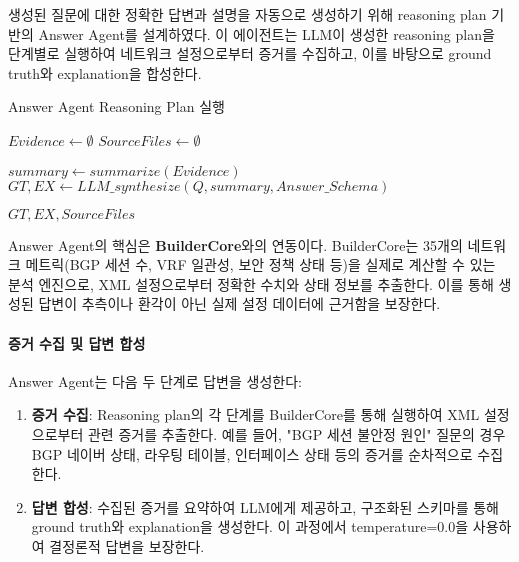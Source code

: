 \documentclass[twocolumn, 10pt]{article}
\newcommand{\subsubsubsection}[1]{\paragraph{#1}}%
\renewcommand{\subsubsubsection}[1]{\paragraph{#1}}%
\begin{document}
생성된 질문에 대한 정확한 답변과 설명을 자동으로 생성하기 위해 reasoning plan
기반의 Answer Agent를 설계하였다. 이 에이전트는 LLM이 생성한 reasoning plan을 단계별로
실행하여 네트워크 설정으로부터 증거를 수집하고, 이를 바탕으로 ground truth와
explanation을 합성한다.

\begin{algorithm}
[t]
\caption{Answer Agent Reasoning Plan 실행}
\label{alg:answer-agent} 

$Evidence \leftarrow \emptyset$ 
$SourceFiles \leftarrow \emptyset$ 


 $summary \leftarrow summarize(Evidence)$ $GT, EX \leftarrow
LLM\_synthesize(Q, summary, Answer\_Schema)$

\Return $GT, EX, SourceFiles$
\end{algorithm}

Answer Agent의 핵심은 \textbf{BuilderCore}와의 연동이다. BuilderCore는 35개의
네트워크 메트릭(BGP 세션 수, VRF 일관성, 보안 정책 상태 등)을 실제로 계산할 수
있는 분석 엔진으로, XML 설정으로부터 정확한 수치와 상태 정보를 추출한다. 이를
통해 생성된 답변이 추측이나 환각이 아닌 실제 설정 데이터에 근거함을 보장한다. \subsubsubsection{증거 수집 및 답변 합성}

Answer Agent는 다음 두 단계로 답변을 생성한다:

\begin{enumerate}
\item \textbf{증거 수집}: Reasoning plan의 각 단계를 BuilderCore를 통해 실행하여
  XML 설정으로부터 관련 증거를 추출한다. 예를 들어, "BGP 세션 불안정 원인" 질문의
  경우 BGP 네이버 상태, 라우팅 테이블, 인터페이스 상태 등의 증거를 순차적으로
  수집한다.

\item \textbf{답변 합성}: 수집된 증거를 요약하여 LLM에게 제공하고, 구조화된
  스키마를 통해 ground truth와 explanation을 생성한다. 이 과정에서 temperature=0.0을
  사용하여 결정론적 답변을 보장한다.
\end{enumerate}
\end{document}
